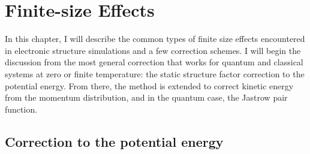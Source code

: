\chapter{Finite-size Effects}

In this chapter, I will describe the common types of finite size effects encountered in electronic structure simulations and a few correction schemes. I will begin the discussion from the most general correction that works for quantum and classical systems at zero or finite temperature: the static structure factor correction to the potential energy. From there, the method is extended to correct kinetic energy from the momentum distribution, and in the quantum case, the Jastrow pair function. %

\section{Correction to the potential energy}

